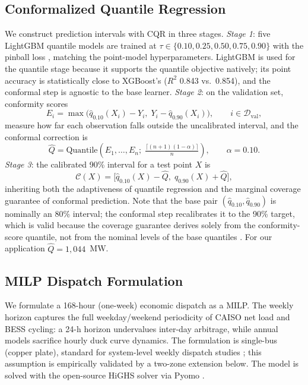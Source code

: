 \documentclass[preprint,12pt,authoryear]{elsarticle}
\begin{document}
\subsection{Conformalized Quantile Regression}
\label{sec:cqr}

We construct prediction intervals with CQR \citep{romano2019} in three stages. \emph{Stage 1}: five LightGBM quantile models are trained at $\tau \in \{0.10, 0.25, 0.50, 0.75, 0.90\}$ with the pinball loss \citep{gneiting2007}, matching the point-model hyperparameters. LightGBM is used for the quantile stage because it supports the quantile objective natively; its point accuracy is statistically close to XGBoost's ($R^2$ 0.843 vs.\ 0.854), and the conformal step is agnostic to the base learner. \emph{Stage 2}: on the validation set, conformity scores
\begin{equation}
E_i = \max\!\big(\hat{q}_{0.10}(X_i) - Y_i,\; Y_i - \hat{q}_{0.90}(X_i)\big), \qquad i \in \mathcal{D}_{\text{val}},
\end{equation}
measure how far each observation falls outside the uncalibrated interval, and the conformal correction is
\begin{equation}
\hat{Q} = \mathrm{Quantile}\!\left(E_1, \ldots, E_n;\; \tfrac{\lceil(n+1)(1-\alpha)\rceil}{n}\right), \qquad \alpha = 0.10 .
\end{equation}
\emph{Stage 3}: the calibrated 90\% interval for a test point $X$ is
\begin{equation}
\mathcal{C}(X) = \big[\hat{q}_{0.10}(X) - \hat{Q},\; \hat{q}_{0.90}(X) + \hat{Q}\big],
\end{equation}
inheriting both the adaptiveness of quantile regression and the marginal coverage guarantee of conformal prediction. Note that the base pair $(\hat{q}_{0.10}, \hat{q}_{0.90})$ is nominally an 80\% interval; the conformal step recalibrates it to the 90\% target, which is valid because the coverage guarantee derives solely from the conformity-score quantile, not from the nominal levels of the base quantiles \citep{romano2019}. For our application $\hat{Q} = 1{,}044$~MW.

\subsection{MILP Dispatch Formulation}
\label{sec:milp}

We formulate a 168-hour (one-week) economic dispatch as a MILP. The weekly horizon captures the full weekday/weekend periodicity of CAISO net load and BESS cycling: a 24-h horizon undervalues inter-day arbitrage, while annual models sacrifice hourly duck curve dynamics. The formulation is single-bus (copper plate), standard for system-level weekly dispatch studies \citep{jenkins2018,denholm2022b}; this assumption is empirically validated by a two-zone extension below. The model is solved with the open-source HiGHS solver \citep{huangfu2018} via Pyomo \citep{hart2017}.
\end{document}
